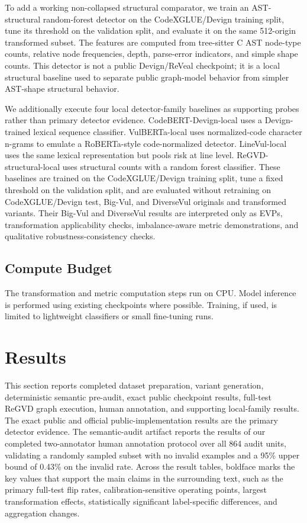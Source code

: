 \documentclass[a4paper,fleqn]{cas-dc}
\begin{document}
To add a working non-collapsed structural comparator, we train an
AST-structural random-forest detector on the CodeXGLUE/Devign training split,
tune its threshold on the validation split, and evaluate it on the same
512-origin transformed subset. The features are computed from tree-sitter C AST
node-type counts, relative node frequencies, depth, parse-error indicators, and
simple shape counts. This detector is not a public Devign/ReVeal checkpoint; it
is a local structural baseline used to separate public graph-model behavior
from simpler AST-shape structural behavior.

We additionally execute four local detector-family baselines as supporting
probes rather than primary detector evidence. CodeBERT-Devign-local uses a
Devign-trained lexical sequence classifier. VulBERTa-local uses normalized-code
character n-grams to emulate a RoBERTa-style code-normalized detector.
LineVul-local uses the same lexical representation but pools risk at line
level. ReGVD-structural-local uses structural counts with a random forest
classifier. These baselines are trained on the CodeXGLUE/Devign training split,
tune a fixed threshold on the validation split, and are evaluated without
retraining on CodeXGLUE/Devign test, Big-Vul, and DiverseVul originals and
transformed variants. Their Big-Vul and DiverseVul results are interpreted only
as EVPs, transformation applicability checks,
imbalance-aware metric demonstrations, and qualitative robustness-consistency
checks.

\subsection{Compute Budget}

The transformation and metric computation steps run on CPU. Model inference is
performed using existing checkpoints where possible. Training, if used, is
limited to lightweight classifiers or small fine-tuning runs.

\section{Results}

This section reports completed dataset preparation, variant generation,
deterministic semantic pre-audit, exact public checkpoint results, full-test
ReGVD graph execution, human annotation, and supporting local-family results.
The exact public and official public-implementation results are the primary detector evidence. The semantic-audit artifact
reports the results of our completed two-annotator human annotation protocol over all 864 audit units,
validating a randomly sampled subset with no invalid examples and a 95\% upper
bound of 0.43\% on the invalid rate.
Across the result tables, boldface marks the key values that support the main
claims in the surrounding text, such as the primary full-test flip rates,
calibration-sensitive operating points, largest transformation effects,
statistically significant label-specific differences, and aggregation changes.
\end{document}
